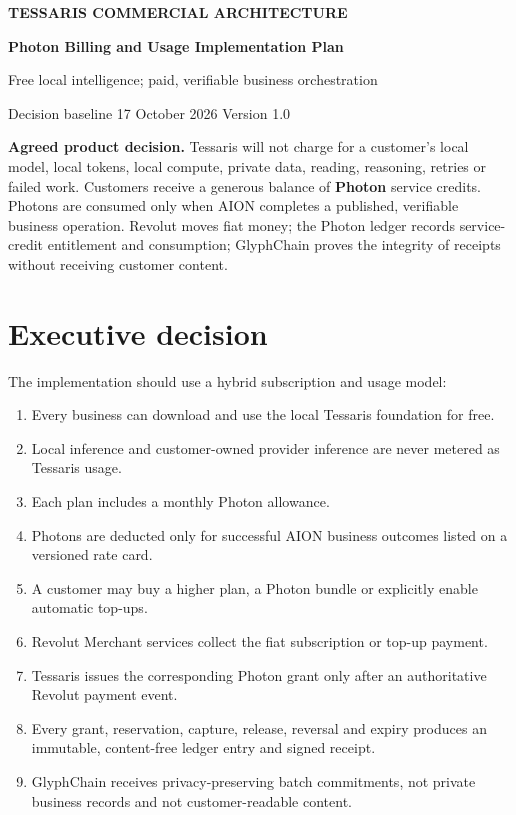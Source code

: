 \documentclass[11pt]{article}
\newcommand{\Photon}{\textbf{Photon}}
\begin{document}
\begin{center}
  {\small\bfseries\color{TessarisBlue} TESSARIS COMMERCIAL ARCHITECTURE}\par
  \vspace{8pt}
  {\LARGE\bfseries Photon Billing and Usage Implementation Plan}\par
  \vspace{7pt}
  {\large Free local intelligence; paid, verifiable business orchestration}\par
  \vspace{12pt}
  {\color{TessarisGrey}Decision baseline \textbullet{} 17 October 2026 \textbullet{} Version 1.0}
\end{center}

\vspace{8pt}
\noindent\colorbox{TessarisPale}{\parbox{0.96\linewidth}{
\textbf{Agreed product decision.} Tessaris will not charge for a customer's local model, local tokens, local compute, private data, reading, reasoning, retries or failed work. Customers receive a generous balance of \Photon{} service credits. Photons are consumed only when AION completes a published, verifiable business operation. Revolut moves fiat money; the Photon ledger records service-credit entitlement and consumption; GlyphChain proves the integrity of receipts without receiving customer content.
}}

\tableofcontents
\newpage

\section{Executive decision}

The implementation should use a hybrid subscription and usage model:

\begin{enumerate}
  \item Every business can download and use the local Tessaris foundation for free.
  \item Local inference and customer-owned provider inference are never metered as Tessaris usage.
  \item Each plan includes a monthly Photon allowance.
  \item Photons are deducted only for successful AION business outcomes listed on a versioned rate card.
  \item A customer may buy a higher plan, a Photon bundle or explicitly enable automatic top-ups.
  \item Revolut Merchant services collect the fiat subscription or top-up payment.
  \item Tessaris issues the corresponding Photon grant only after an authoritative Revolut payment event.
  \item Every grant, reservation, capture, release, reversal and expiry produces an immutable, content-free ledger entry and signed receipt.
  \item GlyphChain receives privacy-preserving batch commitments, not private business records and not customer-readable content.
\end{enumerate}
\end{document}

